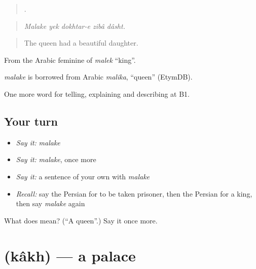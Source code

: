\begin{quote}
    .
\end{quote}

\begin{quote}
\emph{Malake yek dokhtar-e zibâ dâsht.}
\end{quote}

\begin{quote}
The queen had a beautiful daughter.
\end{quote}

From the Arabic feminine of \emph{malek} \textquotedblleft{}king\textquotedblright{}.

\begin{cousinweb}
\emph{malake} is borrowed from Arabic \emph{malika}, \textquotedblleft{}queen\textquotedblright{} (EtymDB).
\end{cousinweb}

\begin{grammarlens}[title={What you've built}]
One more word for telling, explaining and describing at B1.
\end{grammarlens}

\subsection*{Your turn}
\begin{itemize}
\raggedright
  \item \emph{Say it:} \emph{malake}
  \item \emph{Say it:} \emph{malake}, once more
  \item \emph{Say it:} a sentence of your own with \emph{malake}
  \item \emph{Recall:} say the Persian for to be taken prisoner, then the Persian for a king, then say \emph{malake} again
\end{itemize}

\begin{tcolorbox}[breakable,colback=teal!4,colframe=teal!35!black,title={Before you move on}]
What does  mean? (\textquotedblleft{}A queen\textquotedblright{}.) Say it once more.
\end{tcolorbox}
\section[\texorpdfstring{\fa{کاخ} (kâkh)}{کاخ (kâkh)}]{ (kâkh) — a palace}

\label{lesson:FA-C350-kakh}



